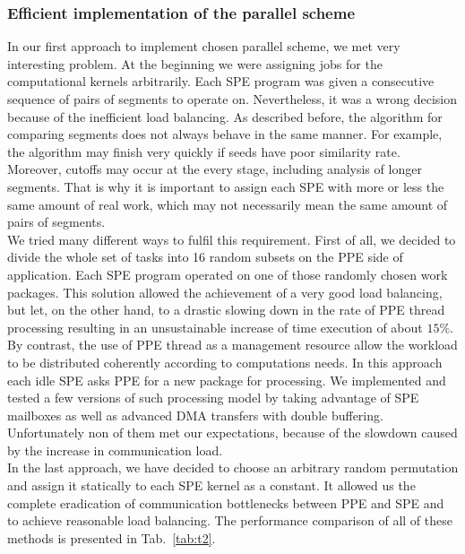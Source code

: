 \subsubsection{Efficient implementation of the parallel scheme}
In our first approach to implement chosen parallel scheme, we met very
interesting problem.
At the beginning we were assigning jobs for the computational kernels
arbitrarily.
Each SPE program was given a consecutive sequence of pairs of segments to
operate on.
Nevertheless, it was a wrong decision because of the inefficient load balancing.
As described before, the algorithm for comparing segments does not always behave in the same manner.
For example, the algorithm may finish very quickly if seeds have poor similarity rate.
Moreover, cutoffs may occur at the every stage, including analysis of longer
segments.
That is why it is important to assign each SPE with more or less the same
amount of real work, which may not necessarily mean the same amount of pairs of
segments.\\
We tried many different ways to fulfil this requirement.
First of all, we decided to divide the whole set of tasks into 16 random subsets
on the PPE side of application.
Each SPE program operated on one of those randomly chosen work packages.
This solution allowed the achievement of a very good load balancing,
but let, on the other hand, to a drastic slowing down in the rate of PPE thread processing resulting in an unsustainable increase of time execution of about $15\%$.\\
By contrast, the use of PPE thread as a management
resource allow the workload to be distributed coherently according to computations needs.
In this approach each idle SPE asks PPE for a new package for processing.
We implemented and tested a few versions of such processing model by taking advantage of SPE mailboxes
as well as advanced DMA transfers with double buffering.
Unfortunately non of them met our expectations, because of the slowdown caused
by the increase in communication load.\\
In the last approach, we have decided to choose an arbitrary random  permutation and assign it statically to each SPE kernel as a constant.
It allowed us the complete eradication of communication bottlenecks between PPE and SPE and
to achieve reasonable load balancing.
The performance comparison of all of these methods is presented in
Tab.~\ref{tab:t2}.

